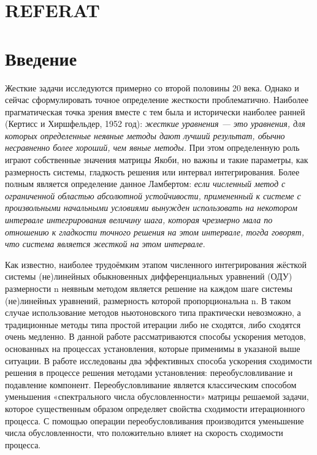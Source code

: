 \documentclass[a4paper,14pt]{extreport}
\begin{document}
\chapter*{REFERAT}

  {
    \renewcommand{\contentsname}{Содержание}
    \tableofcontents
  }

  \chapter*{Введение}
  Жесткие задачи исследуются примерно со второй половины 20 века. Однако и сейчас сформулировать точное определение жесткости проблематично. Наиболее прагматическая точка зрения вместе с тем была и исторически наиболее ранней (Кертисс и Хиршфельдер, 1952 год): \textit{жесткие уравнения — это уравнения, для которых определенные неявные методы дают лучший результат, обычно несравненно более хороший, чем явные методы.} При этом определенную роль играют собственные значения матрицы Якоби, но важны и такие параметры, как размерность системы, гладкость решения или интервал интегрирования. 
Более полным является определение данное Ламбертом: \textit{если численный метод с ограниченной областью абсолютной устойчивости, примененный к системе с произвольными начальными условиями вынужден использовать на некотором интервале интегрирования величину шага, которая чрезмерно мала по отношению к гладкости точного решения на этом интервале, тогда говорят, что система является жесткой на этом интервале}\cite{hairer}.


Как известно, наиболее трудоёмким этапом численного интегрирования жёсткой системы (не)линейных обыкновенных дифференциальных уравнений (ОДУ) размерности n неявным методом является решение на каждом шаге системы (не)линейных уравнений, размерность которой пропорциональна n. В таком случае использование методов ньютоновского типа практически невозможно, а традиционные методы типа простой итерации либо не сходятся, либо сходятся очень медленно. В данной работе рассматриваются способы ускорения методов, основанных на процессах установления, которые применимы в указаной выше ситуации.
В работе исследованы два эффективных способа ускорения сходимости решения в процессе решения методами установления: переобусловливание и подавление компонент. Переобусловливание является классическим способом уменьшения «спектрального числа обусловленности» матрицы решаемой задачи, которое существенным образом определяет свойства сходимости итерационного процесса. С помощью операции переобусловливания производится уменьшение числа обусловленности, что положительно влияет на скорость сходимости процесса.
\end{document}
